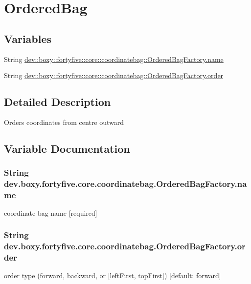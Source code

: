 \hypertarget{group___ordered_bag}{
\section{OrderedBag}
\label{d2/d8e/group___ordered_bag}
}
\subsection*{Variables}
\begin{DoxyCompactItemize}
\item 
String \hyperlink{group___ordered_bag_ga195495c2affffa2242ffdc06ba38ec78}{dev::boxy::fortyfive::core::coordinatebag::OrderedBagFactory.name}
\item 
String \hyperlink{group___ordered_bag_ga3b0bca31616241e893f2d58440a2f7f7}{dev::boxy::fortyfive::core::coordinatebag::OrderedBagFactory.order}
\end{DoxyCompactItemize}


\subsection{Detailed Description}
Orders coordinates from centre outward 

\subsection{Variable Documentation}
\hypertarget{group___ordered_bag_ga195495c2affffa2242ffdc06ba38ec78}{
\subsubsection[{name}]{\setlength{\rightskip}{0pt plus 5cm}String {\bf dev.boxy.fortyfive.core.coordinatebag.OrderedBagFactory.name}}}
\label{d2/d8e/group___ordered_bag_ga195495c2affffa2242ffdc06ba38ec78}
coordinate bag name \mbox{[}required\mbox{]} \hypertarget{group___ordered_bag_ga3b0bca31616241e893f2d58440a2f7f7}{
\subsubsection[{order}]{\setlength{\rightskip}{0pt plus 5cm}String {\bf dev.boxy.fortyfive.core.coordinatebag.OrderedBagFactory.order}}}
\label{d2/d8e/group___ordered_bag_ga3b0bca31616241e893f2d58440a2f7f7}
order type (forward, backward, or \mbox{[}leftFirst, topFirst\mbox{]}) \mbox{[}default: forward\mbox{]} 